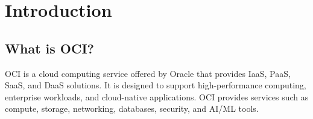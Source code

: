 \documentclass[../main.tex]{subfiles}
\begin{document}
\chapter{Introduction}
\section{What is OCI?}
\gls{OCI} is a cloud computing service offered by Oracle that provides \gls{IaaS}, \gls{PaaS}, \gls{SaaS}, and \gls{DaaS} solutions.
It is designed to support high-performance computing, enterprise workloads, and cloud-native applications.
OCI provides services such as compute, storage, networking, databases, security, and \gls{AI}/\gls{ML} tools.

\printglossaries
\end{document}
